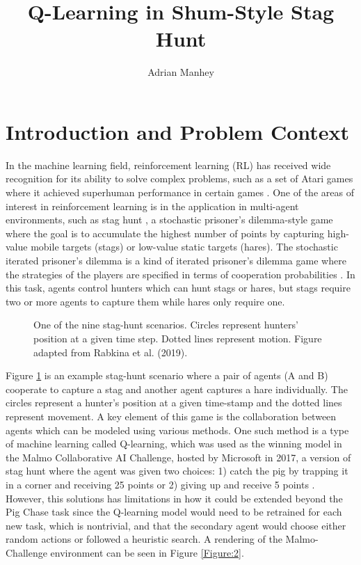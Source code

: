 \documentclass[10pt,twocolumn]{article}
\title{Q-Learning in Shum-Style Stag Hunt}
\author{Adrian Manhey}
\affiliation{Occidental College}
\begin{document}
\maketitle

\section{Introduction and Problem Context}

In the machine learning field, reinforcement learning (RL) has received wide recognition for its ability to solve complex problems, such as a set of Atari games where it achieved superhuman performance in certain games \cite{Volodymyr2013}.
One of the areas of interest in reinforcement learning is in the application in multi-agent environments, such as stag hunt \cite{Skyrms2001}, a stochastic prisoner’s dilemma-style game where the goal is to accumulate the highest number of points by capturing high-value mobile targets (stags) or low-value static targets (hares).
The stochastic iterated prisoner’s dilemma is a kind of iterated prisoner’s dilemma game where the strategies of the players are specified in terms of cooperation probabilities \cite{Li2014}.
In this task, agents control hunters which can hunt stags or hares, but stags require two or more agents to capture them while hares only require one.

\begin{figure}[ht]
\vspace{0.5cm}
\centering
\caption{One of the nine stag-hunt scenarios. Circles represent hunters’ position at a given time step. Dotted lines represent motion. Figure adapted from Rabkina et al. (2019).}
\label{Figure:1}
\end{figure}

Figure \ref{Figure:1} is an example stag-hunt scenario \cite{Rabkina2019} where a pair of agents (A and B) cooperate to capture a stag and another agent captures a hare individually.
The circles represent a hunter's position at a given time-stamp and the dotted lines represent movement.
A key element of this game is the collaboration between agents which can be modeled using various methods.
One such method is a type of machine learning called Q-learning, which was used as the winning model in the Malmo Collaborative AI Challenge, hosted by Microsoft in 2017, a version of stag hunt where the agent was given two choices: 1) catch the pig by trapping it in a corner and receiving 25 points or 2) giving up and receive 5 points \cite{Katja2017}.
However, this solutions has limitations in how it could be extended beyond the Pig Chase task since the Q-learning model would need to be retrained for each new task, which is nontrivial, and that the secondary agent would choose either random actions or followed a heuristic search.
A rendering of the Malmo-Challenge environment can be seen in Figure \ref{Figure:2}.
\end{document}
